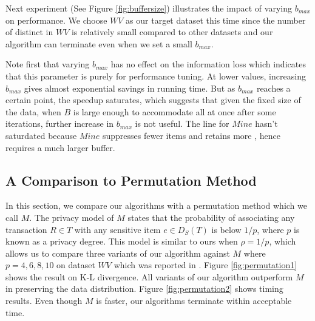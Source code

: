 Next experiment (See Figure \ref{fig:buffersize}) illustrates
the impact of varying $b_{max}$ on performance.
We choose $WV$ as our target dataset this time since the number of
distinct \qids in $WV$ is relatively small compared to
other datasets and our algorithm
can terminate even when we set a small $b_{max}$.

Note first that varying $b_{max}$ has no effect on
the information loss which
indicates that this parameter is purely for performance tuning.
At lower values, increasing $b_{max}$ gives almost exponential
savings in running time. But as $b_{max}$ reaches a certain point, the speedup
saturates, which suggests that given the fixed size of the data,
when $B$ is large enough to accommodate all \qids at once after some iterations,
further increase in $b_{max}$ is not useful.
The line for $Mine$ hasn't saturdated because $Mine$ suppresses
fewer items and retains more \qids, hence requires a much larger
buffer.

\subsection{A Comparison to Permutation Method}
In this section, we compare our algorithms with a permutation method
\cite{2011:TKDE:Anonymous}
which we call $M$.
The privacy model of $M$
states that the probability of associating any transaction $R \in T$ with
any sensitive item $e \in D_S(T)$ is below $1/p$, where $p$ is known as
a privacy degree. This model is similar to ours when $\rho = 1/p$,
which allows us to compare three variants of our algorithm against
$M$ where $p=4, 6, 8, 10$ on dataset $WV$ which was reported in
\cite{2011:TKDE:Anonymous}.
Figure \ref{fig:permutation1} shows the result on K-L divergence.
All variants of our algorithm outperform $M$ in
preserving the data distribution.
Figure \ref{fig:permutation2} shows timing results.
Even though $M$ is faster, our algorithms
terminate within acceptable time.

